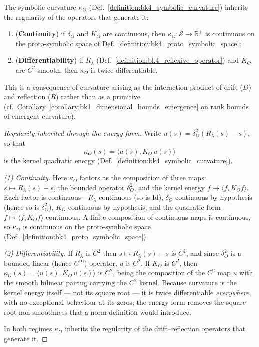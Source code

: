 \begin{theorem}
\label{theorem:bk4_curvature_continuity}
\label{theorem:bk4_curvature_differentiability}
The symbolic curvature $\kappa_O$ (Def.~\ref{definition:bk4_symbolic_curvature}) inherits the regularity of the operators that generate it:
\begin{enumerate}
    \item (\textbf{Continuity}) if $\delta_O$ and $K_O$ are continuous, then $\kappa_O : \mathcal{S} \to \mathbb{R}^+$ is continuous on the proto-symbolic space of Def.~\ref{definition:bk4_proto_symbolic_space};
    \item (\textbf{Differentiability}) if $R_\lambda$ (Def.~\ref{definition:bk4_reflexive_operator}) and $K_O$ are $C^2$ smooth, then $\kappa_O$ is twice differentiable.
\end{enumerate}
This is a consequence of curvature arising as the interaction product of drift ($D$) and reflection ($R$) rather than as a primitive (cf.~Corollary~\ref{corollary:bk1_dimensional_bounds_emergence} on rank bounds of emergent curvature).
\end{theorem}

\begin{proof}[Regularity inherited through the energy form]
\label{proof:bk4_curvature_continuity}
\label{proof:bk4_curvature_differentiability}
\leavevmode
Write $u(s) = \delta_O^2(R_\lambda(s) - s)$, so that
\[
\kappa_O(s) = \langle u(s), K_O\,u(s)\rangle
\]
is the kernel quadratic energy (Def.~\ref{definition:bk4_symbolic_curvature}).

\emph{(1) Continuity.} Here $\kappa_O$ factors as the composition of three maps: $s \mapsto R_\lambda(s) - s$, the bounded operator $\delta_O^2$, and the kernel energy $f \mapsto \langle f, K_O f\rangle$. Each factor is continuous---$R_\lambda$ continuous (so is $\mathrm{Id}$), $\delta_O$ continuous by hypothesis (hence so is $\delta_O^2$), $K_O$ continuous by hypothesis, and the quadratic form $f\mapsto\langle f,K_O f\rangle$ continuous. A finite composition of continuous maps is continuous, so $\kappa_O$ is continuous on the proto-symbolic space (Def.~\ref{definition:bk4_proto_symbolic_space}).

\emph{(2) Differentiability.} If $R_\lambda$ is $C^2$ then $s \mapsto R_\lambda(s) - s$ is $C^2$, and since $\delta_O^2$ is a bounded linear (hence $C^\infty$) operator, $u$ is $C^2$. If $K_O$ is $C^2$, then $\kappa_O(s) = \langle u(s), K_O\,u(s)\rangle$ is $C^2$, being the composition of the $C^2$ map $u$ with the smooth bilinear pairing carrying the $C^2$ kernel. Because curvature is the kernel energy itself --- not its square root --- it is twice differentiable \emph{everywhere}, with no exceptional behaviour at its zeros; the energy form removes the square-root non-smoothness that a norm definition would introduce.

In both regimes $\kappa_O$ inherits the regularity of the drift--reflection operators that generate it.
\end{proof}


